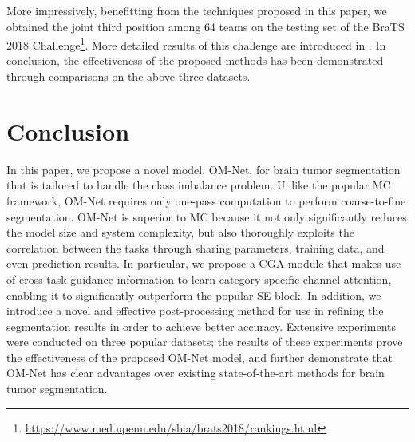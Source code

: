 \documentclass[journal,twoside]{IEEEtran}
\begin{document}
More impressively, benefitting from the techniques proposed in this paper, we obtained the joint third position among 64 teams on the testing set of the BraTS 2018 Challenge\footnote[2]{\url{https://www.med.upenn.edu/sbia/brats2018/rankings.html}}. More detailed results of this challenge are introduced in \cite{bakas2018identifying}. In conclusion, the effectiveness of the proposed methods has been demonstrated through comparisons on the above three datasets.







\section{Conclusion}
In this paper, we propose a novel model, OM-Net, for brain tumor segmentation that is tailored to handle the class imbalance problem. Unlike the popular MC framework, OM-Net requires only one-pass computation to perform coarse-to-fine segmentation. OM-Net is superior to MC because it not only significantly reduces the model size and system complexity, but also thoroughly exploits the correlation between the tasks through sharing parameters, training data, and even prediction results. In particular, we propose a CGA module that makes use of cross-task guidance information to learn category-specific channel attention, enabling it to significantly outperform the popular SE block. In addition, we introduce a novel and effective post-processing method for use in refining the segmentation results in order to achieve better accuracy. Extensive experiments were conducted on three popular datasets; the results of these experiments prove the effectiveness of the proposed OM-Net model, and further demonstrate that OM-Net has clear advantages over existing state-of-the-art methods for brain tumor segmentation.
\end{document}
